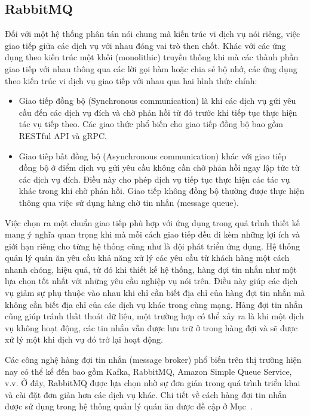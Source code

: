 \subsection{RabbitMQ}
Đối với một hệ thống phân tán nói chung mà kiến trúc vi dịch vụ nói riêng, việc giao tiếp giữa các dịch vụ với nhau đóng vai trò then chốt.
Khác với các ứng dụng theo kiến trúc một khối (monolithic) truyền thống khi mà các thành phần giao tiếp với nhau thông qua các lời gọi hàm hoặc chia sẻ bộ nhớ, các ứng dụng theo kiến trúc vi dịch vụ giao tiếp với nhau qua hai hình thức chính:
\begin{itemize}
    \item Giao tiếp đồng bộ (Synchronous communication) là khi các dịch vụ gửi yêu cầu đến các dịch vụ đích và chờ phản hồi từ đó trước khi tiếp tục thực hiện tác vụ tiếp theo. Các giao thức phổ biến cho giao tiếp đồng bộ bao gồm RESTful API và gRPC.
    \item Giao tiếp bất đồng bộ (Asynchronous communication) khác với giao tiếp đồng bộ ở điểm dịch vụ gửi yêu cầu không cần chờ phản hồi ngay lập tức từ các dịch vụ đích.
    Điều này cho phép dịch vụ tiếp tục thực hiện các tác vụ khác trong khi chờ phản hồi.
    Giao tiếp không đồng bộ thường được thực hiện thông qua việc sử dụng hàng chờ tin nhắn (message queue).
\end{itemize}
Việc chọn ra một chuẩn giao tiếp phù hợp với ứng dụng trong quá trình thiết kế mang ý nghĩa quan trọng khi mà mỗi cách giao tiếp đều đi kèm những lợi ích và giới hạn riêng cho từng hệ thống cũng như là đội phát triển ứng dụng.
Hệ thống quản lý quán ăn yêu cầu khả năng xử lý các yêu cầu từ khách hàng một cách nhanh chóng, hiệu quả, từ đó khi thiết kế hệ thống, hàng đợi tin nhắn như một lựa chọn tốt nhất với những yêu cầu nghiệp vụ nói trên.
Điều này giúp các dịch vụ giảm sự phụ thuộc vào nhau khi chỉ cần biết địa chỉ của hàng đợi tin nhắn mà không cần biết địa chỉ của các dịch vụ khác trong cùng mạng.
Hàng đợi tin nhắn cũng giúp tránh thất thoát dữ liệu, một trường hợp có thể xảy ra là khi một dịch vụ không hoạt động, các tin nhắn vẫn được lưu trữ ở trong hàng đợi và sẽ được xử lý một khi dịch vụ đó trở lại hoạt động.

Các công nghệ hàng đợi tin nhắn (message broker) phổ biến trên thị trường hiện nay có thể kể đến bao gồm Kafka, RabbitMQ, Amazon Simple Queue Service, v.v.
Ở đây, RabbitMQ được lựa chọn nhờ sự đơn giản trong quá trình triển khai và cài đặt đơn giản hơn các dịch vụ khác.
Chi tiết về cách hàng đợi tin nhắn được sử dụng trong hệ thống quản lý quán ăn được đề cập ở Mục~.
